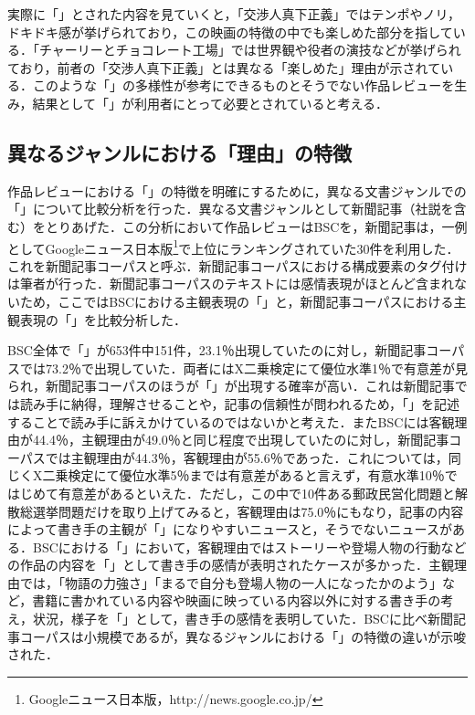 \documentclass[japanese]{jnlp_1.3a}
\begin{document}
実際に「」とされた内容を見ていくと，「交渉人真下正義」ではテンポやノリ，ドキドキ感が挙げられており，この映画の特徴の中でも楽しめた部分を指している．「チャーリーとチョコレート工場」では世界観や役者の演技などが挙げられており，前者の「交渉人真下正義」とは異なる「楽しめた」理由が示されている．このような「」の多様性が参考にできるものとそうでない作品レビューを生み，結果として「」が利用者にとって必要とされていると考える．

\subsection{異なるジャンルにおける「理由」の特徴}

作品レビューにおける「」の特徴を明確にするために，異なる文書ジャンルでの「」について比較分析を行った．異なる文書ジャンルとして新聞記事（社説を含む）をとりあげた．この分析において作品レビューはBSCを，新聞記事は，一例としてGoogleニュース日本版\footnote{
	Googleニュース日本版，http://news.google.co.jp/}で上位にランキングされていた30件を利用した．これを新聞記事コーパスと呼ぶ．新聞記事コーパスにおける構成要素のタグ付けは筆者が行った．新聞記事コーパスのテキストには感情表現がほとんど含まれないため，ここではBSCにおける主観表現の「」と，新聞記事コーパスにおける主観表現の「」を比較分析した．

BSC全体で「」が653件中151件，23.1{\kern0pt}％出現していたのに対し，新聞記事コーパスでは73.2{\kern0pt}％で出現していた．両者にはX二乗検定にて優位水準1{\kern0pt}％で有意差が見られ，新聞記事コーパスのほうが「」が出現する確率が高い．これは新聞記事では読み手に納得，理解させることや，記事の信頼性が問われるため，「」を記述することで読み手に訴えかけているのではないかと考えた．またBSCには客観理由が44.4{\kern0pt}％，主観理由が49.0{\kern0pt}％と同じ程度で出現していたのに対し，新聞記事コーパスでは主観理由が44.3{\kern0pt}％，客観理由が55.6{\kern0pt}％であった．これについては，同じくX二乗検定にて優位水準5{\kern0pt}％までは有意差があると言えず，有意水準10{\kern0pt}％ではじめて有意差があるといえた．ただし，この中で10件ある郵政民営化問題と解散総選挙問題だけを取り上げてみると，客観理由は75.0{\kern0pt}％にもなり，記事の内容によって書き手の主観が「」になりやすいニュースと，そうでないニュースがある．BSCにおける「」において，客観理由ではストーリーや登場人物の行動などの作品の内容を「」として書き手の感情が表明されたケースが多かった．主観理由では，「物語の力強さ」「まるで自分も登場人物の一人になったかのよう」など，書籍に書かれている内容や映画に映っている内容以外に対する書き手の考え，状況，様子を「」として，書き手の感情を表明していた．BSCに比べ新聞記事コーパスは小規模であるが，異なるジャンルにおける「」の特徴の違いが示唆された．
\end{document}
